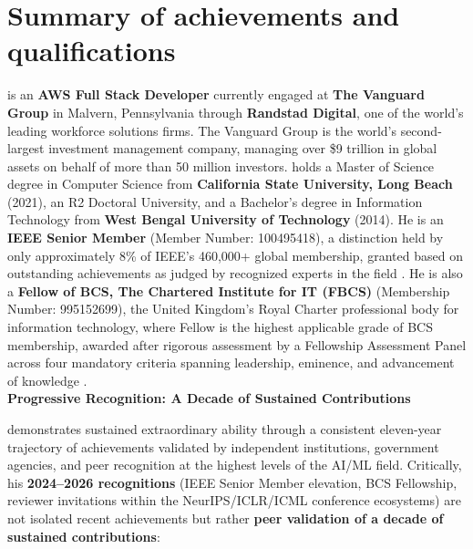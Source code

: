 \section{Summary of \drs achievements and qualifications}

\dr is an \textbf{AWS Full Stack Developer} currently engaged at \textbf{The Vanguard Group} in Malvern, Pennsylvania through \textbf{Randstad Digital}, one of the world's leading workforce solutions firms. The Vanguard Group is the world's second-largest investment management company, managing over \$9 trillion in global assets on behalf of more than 50 million investors. \dr holds a Master of Science degree in Computer Science from \textbf{California State University, Long Beach} (2021), an R2 Doctoral University, and a Bachelor's degree in Information Technology from \textbf{West Bengal University of Technology} (2014). He is an \textbf{IEEE Senior Member} (Member Number: 100495418), a distinction held by only approximately 8\% of IEEE's 460,000+ global membership, granted based on outstanding achievements as judged by recognized experts in the field \cite{ieeeseniorresults}. He is also a \textbf{Fellow of BCS, The Chartered Institute for IT (FBCS)} (Membership Number: 995152699), the United Kingdom's Royal Charter professional body for information technology, where Fellow is the highest applicable grade of BCS membership, awarded after rigorous assessment by a Fellowship Assessment Panel across four mandatory criteria spanning leadership, eminence, and advancement of knowledge \cite{bcsfellowportal}.\\


\textbf{Progressive Recognition: A Decade of Sustained Contributions}

\dr demonstrates sustained extraordinary ability through a consistent eleven-year trajectory of achievements validated by independent institutions, government agencies, and peer recognition at the highest levels of the AI/ML field. Critically, his \textbf{2024--2026 recognitions} (IEEE Senior Member elevation, BCS Fellowship, reviewer invitations within the NeurIPS/ICLR/ICML conference ecosystems) are not isolated recent achievements but rather \textbf{peer validation of a decade of sustained contributions}:

